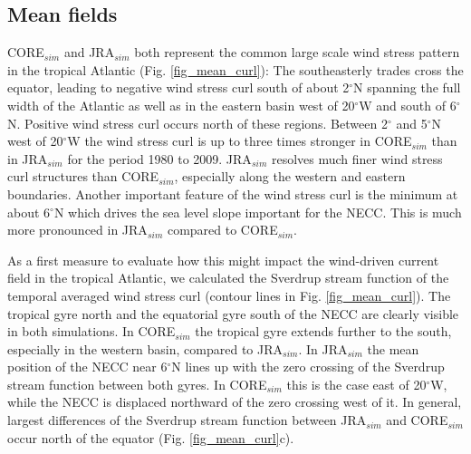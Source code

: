 \documentclass[os, manuscript]{copernicus}
\begin{document}
\subsection{Mean fields}
CORE$_{sim}$ and JRA$_{sim}$ both represent the common large scale wind stress pattern in the tropical Atlantic (Fig. \ref{fig_mean_curl}): The southeasterly trades cross the equator, leading to negative wind stress curl south of about 2$^{\circ}$N spanning the full width of the Atlantic as well as in the eastern basin west of 20$^{\circ}$W and south of 6$^{\circ}$N. Positive wind stress curl occurs north of these regions. Between 2$^{\circ}$ and 5$^{\circ}$N west of 20$^{\circ}$W  the wind stress curl is up to three times stronger in CORE$_{sim}$ than in JRA$_{sim}$ for the period 1980 to 2009. JRA$_{sim}$ resolves much finer wind stress curl structures than CORE$_{sim}$, especially along the western and eastern boundaries. Another important feature of the wind stress curl is the minimum at about 6$^{\circ}$N which drives the sea level slope important for the NECC. This is much more pronounced in JRA$_{sim}$ compared to CORE$_{sim}$.

As a first measure to evaluate how this might impact the wind-driven current field in the tropical Atlantic, we calculated the Sverdrup stream function of the temporal averaged wind stress curl (contour lines in Fig. \ref{fig_mean_curl}). The tropical gyre north and the equatorial gyre south of the NECC are clearly visible in both simulations. In CORE$_{sim}$ the tropical gyre extends further to the south, especially in the western basin, compared to JRA$_{sim}$. In JRA$_{sim}$ the mean position of the NECC near 6$^{\circ}$N lines up with the zero crossing of the Sverdrup stream function between both gyres. In CORE$_{sim}$ this is the case east of 20$^{\circ}$W, while the NECC is displaced northward of the zero crossing west of it. In general, largest differences of the Sverdrup stream function between JRA$_{sim}$ and CORE$_{sim}$ occur north of the equator (Fig. \ref{fig_mean_curl}c). 
\end{document}
